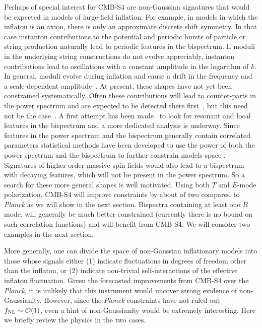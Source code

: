 Perhaps of special interest for CMB-S4 are non-Gaussian signatures that would be expected in models of large field inflation. For example, in models in which the inflaton is an axion, there is only an approximate discrete shift symmetry. In that case instanton contributions to the potential and periodic bursts of particle or string production naturally lead to periodic features in the bispectrum. If moduli in the underlying string constructions do not evolve appreciably, instanton contributions lead to oscillations with a constant amplitude in the logarithm of $k$. In general, moduli evolve during inflation and cause a drift in the frequency and a scale-dependent amplitude~\cite{Flauger:2014ana}. At present, these shapes have not yet been constrained systematically. Often these contributions will lead to counter-parts in the power spectrum and are expected to be detected there first~\cite{Behbahani:2011it}, but this need not be the case~\cite{Behbahani:2012be}. A first attempt has been made~\cite{Ade:2015ava} to look for resonant and local features in the bispectrum and a more dedicated analysis is underway. Since features in the power spectrum and the bispectrum generally contain correlated parameters \cite{Achucarro:2010da,NonBDBispectrum2009,nonBDbispectrum2015,Flauger:2010ja} statistical methods have been developed to use the power of both the power spectrum and the bispectrum to further constrain models space \cite{Meerburg2015b,Moritz2016,Fergusson:2014hya}. Signatures of higher order massive spin fields \cite{Arkani-Hamed:2015bza,Chen:2015lza} would also lead to a bispectrum with decaying features, which will not be present in the power spectrum.  So a search for these more general shapes is well motivated. Using both $T$ and $E$-mode polarization, CMB-S4 will improve constraints by about of two compared to {\it Planck} as we will show in the next section. Bispectra containing at least one $B$ mode, will generally be much better constrained (currently there is no bound on such correlation functions) and will benefit from CMB-S4. We will consider two examples in the next section. 

More generally, one can divide the space of non-Gaussian inflationary models into those whose signals either (1) indicate fluctuations in degrees of freedom other than the inflaton, or (2) indicate non-trivial self-interactions of the effective inflaton fluctuation. Given the forecasted improvements from CMB-S4 over the {\it Planck}, it is unlikely that this instrument would uncover strong evidence of non-Gaussianity. However, since the {\it Planck} constraints have not ruled out $f_{\rm NL}\sim\mathcal{O}(1)$, even a hint of non-Gaussianity would be extremely interesting. Here we briefly review the physics in the two cases.

